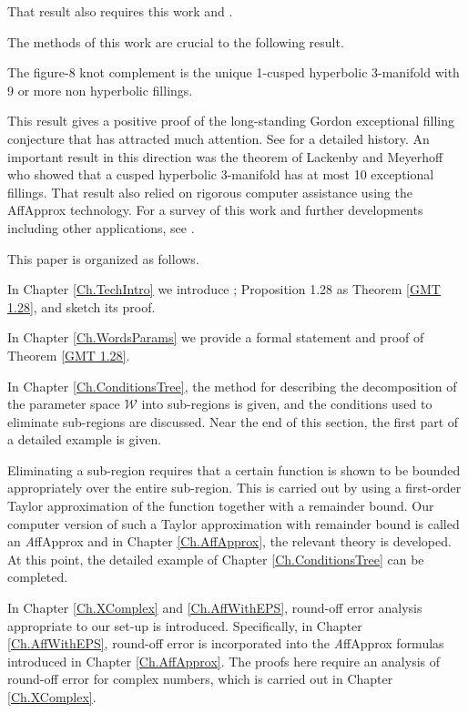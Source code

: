 That result also requires this work and \cite{GMT}.  \vskip 8pt

The methods of this work are crucial to the following result.

\begin{theorem} \cite{GHMTY} The figure-8 knot complement is the unique 1-cusped hyperbolic 3-manifold with 9 or more non hyperbolic fillings.  \end{theorem}
 
This result gives a positive proof of the long-standing Gordon exceptional filling conjecture that has attracted much attention.  See \cite{GHMTY} for a detailed history.  An important result in this direction was the theorem of Lackenby and Meyerhoff \cite{LM} who showed that a cusped hyperbolic 3-manifold has at most 10 exceptional fillings.  That result also relied on rigorous computer assistance using the AffApprox technology.
\vskip 8pt
For a survey of this work and further developments including other applications, see \cite{GMTY}.

\vskip 8pt

This paper is organized as follows.

In Chapter \ref{Ch.TechIntro} we introduce
\cite{GMT}; Proposition 1.28 as Theorem \ref{GMT 1.28},
and sketch its proof.

In Chapter \ref{Ch.WordsParams} we provide a formal statement and proof of Theorem \ref{GMT 1.28}.

In Chapter \ref{Ch.ConditionsTree},
the method for describing the decomposition
of the parameter space ${\mathcal W}$ into sub-regions is given,
and the conditions used to eliminate sub-regions are discussed.
Near the end of this section, the first part of a detailed example is given.

Eliminating 
a sub-region requires that a certain function is shown to be bounded 
appropriately over the entire sub-region.  This is carried out by using a 
first-order Taylor approximation of the function together with a 
remainder 
bound.
Our computer version of such a Taylor approximation with remainder bound 
is called an {\textit AffApprox} and in Chapter \ref{Ch.AffApprox},
the relevant theory is developed.
At this point, the detailed example of Chapter \ref{Ch.ConditionsTree} can be completed.

In Chapter \ref{Ch.XComplex} and \ref{Ch.AffWithEPS}, round-off error analysis appropriate to our 
set-up is introduced.  Specifically, in Chapter \ref{Ch.AffWithEPS}, round-off error is 
incorporated 
into the {\textit AffApprox} formulas introduced in Chapter \ref{Ch.AffApprox}.  The proofs here 
require an analysis of round-off error for complex numbers, which is carried 
out in Chapter \ref{Ch.XComplex}.

